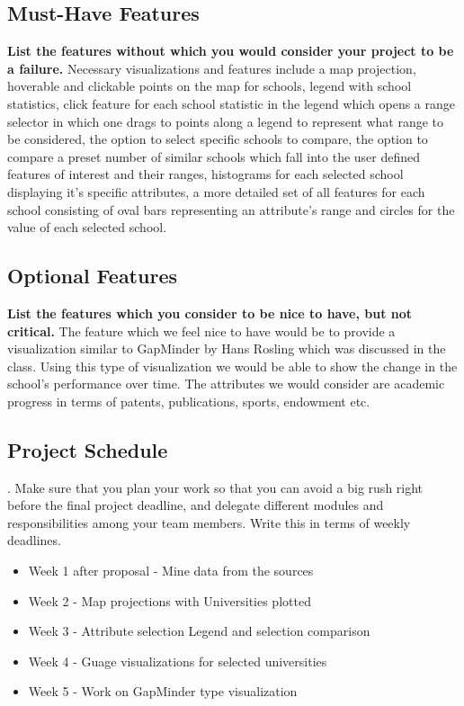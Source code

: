 \documentclass[11pt, a4paper]{article}
\begin{document}
  \subsection{Must-Have Features}\textbf{ List the features without which you would consider your project to be a failure.}
  Necessary visualizations and features include a map projection, hoverable and clickable points on the map for schools, legend with school statistics, click feature for each school statistic in the legend which opens a range selector in which one drags to points along a legend to represent what range to be considered, the option to select specific schools to compare, the option to compare a preset number of similar schools which fall into the user defined features of interest and their ranges, histograms for each selected school displaying it's specific attributes, a more detailed set of all features for each school consisting of oval bars representing an attribute's range and circles for the value of each selected school.

\subsection{Optional Features}\textbf{ List the features which you consider to be nice to have, but not critical.}
The feature which we feel nice to have would be to provide a visualization similar to GapMinder by Hans Rosling which was discussed in the class. Using this type of visualization we would be able to show the change in the school's performance over time.
The attributes we would consider are academic progress in terms of patents, publications, sports, endowment etc.

\vspace{5em}
\subsection{Project Schedule}{. Make sure that you plan your work so that you can avoid a big rush right before the final project deadline, and delegate different modules and responsibilities among your team members. Write this in terms of weekly deadlines.}
\begin{itemize}
\item Week 1 after proposal - Mine data from the sources
\item Week 2 - Map projections with Universities plotted
\item Week 3 -  Attribute selection Legend and selection comparison
\item Week 4 - Guage visualizations for selected universities
\item Week 5 - Work on GapMinder type visualization
\end{itemize}
\end{document}
